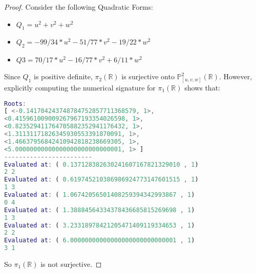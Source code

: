 \documentclass{article}
\newcommand{\Rbb}{\mathbb{R}}
\newcommand{\Pbb}{\mathbb{P}}
\begin{document}
\begin{proof}
Consider the following Quadratic Forms:
\begin{itemize}
    \item $Q_1 = u^2 + v^2 + w^2$
    \item $Q_2 = -99/34*u^2 - 51/77*v^2 - 19/22*w^2$
    \item $Q3 = 70/17*u^2 - 16/77*v^2 + 6/11*w^2$
\end{itemize}
Since $Q_1$ is positive definite, $\pi_2(\Rbb)$ is surjective onto $\Pbb^{2}_{[u, v, w]}(\Rbb)$. However, explicitly computing the numerical signature for $\pi_1(\Rbb)$ shows that:
\begin{lstlisting}[language=Matlab, caption=$\pi_1(\mathbb{R})$ is Not Surjective]
Roots:
[ <-0.141704243748784752857711368579, 1>,
<0.415961009009267967193354026598, 1>,
<0.823529411764705882352941176432, 1>,
<1.31131171826345930553391870091, 1>,
<1.46637956842410942818238669305, 1>,
<5.00000000000000000000000000001, 1> ]
------------------------
Evaluated at: ( 0.137128382630241607167821329010 , 1)
2 2
Evaluated at: ( 0.619745210386986924773147601515 , 1)
1 3
Evaluated at: ( 1.06742056501408259394342993867 , 1)
0 4
Evaluated at: ( 1.38884564334378436685815269698 , 1)
1 3
Evaluated at: ( 3.23318978421205471409119334653 , 1)
2 2
Evaluated at: ( 6.00000000000000000000000000001 , 1)
3 1
\end{lstlisting}
So $\pi_1(\Rbb)$ is not surjective.
\end{proof}
\end{document}

